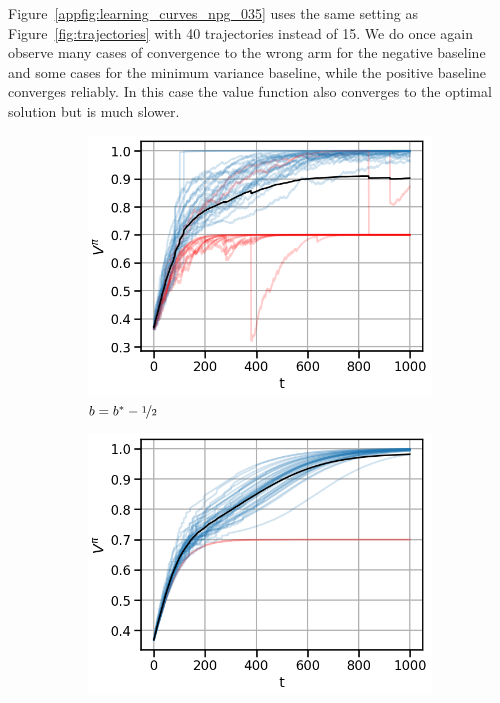 Figure~\ref{appfig:learning_curves_npg_035} uses the same setting as Figure~\ref{fig:trajectories} with 40 trajectories instead of 15. We do once again observe many cases of convergence to the wrong arm for the negative baseline and some cases for the minimum variance baseline, while the positive baseline converges reliably. In this case the value function also converges to the optimal solution but is much slower.

\begin{figure}[!ht]
\centering
  \begin{subfigure}[b]{0.245\linewidth}
    \includegraphics[width=\textwidth]{articles/baselines/figs/appendix_figs_3arm_033/natural_minvar_-05_eta=0025.png}
    \caption{$b = b^\ast - \nicefrac{1}{2}$}
  \end{subfigure}
    \begin{subfigure}[b]{0.245\linewidth}
    \includegraphics[width=\textwidth]{articles/baselines/figs/appendix_figs_3arm_033/natural_minvar_0_eta=0025.png}

\end{subfigure}
\end{figure}
